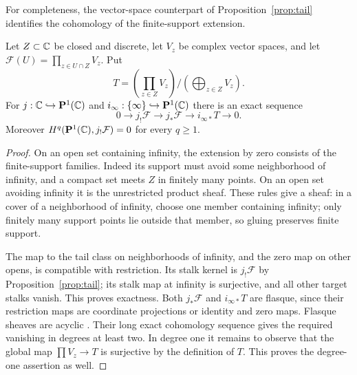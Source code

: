 For completeness, the vector-space counterpart of Proposition~\ref{prop:tail} identifies the cohomology of the finite-support extension.

\begin{proposition}\label{prop:packet-tail-exact}
Let $Z\subset\mathbb C$ be closed and discrete, let $V_z$ be complex vector spaces, and let $\mathcal F(U)=\prod_{z\in U\cap Z}V_z$. Put
\[
 T=\left(\prod_{z\in Z}V_z\right)
       \Big/\left(\bigoplus_{z\in Z}V_z\right).
\]
For $j:\mathbb C\hookrightarrow\mathbf P^1(\mathbb C)$ and $i_\infty:\{\infty\}\hookrightarrow\mathbf P^1(\mathbb C)$ there is an exact sequence
\[
 0\longrightarrow j_!\mathcal F\longrightarrow j_*\mathcal F
   \longrightarrow i_{\infty*}T\longrightarrow0.
\]
Moreover $H^q(\mathbf P^1(\mathbb C),j_!\mathcal F)=0$ for every $q\geq1$.
\end{proposition}
\begin{proof}
On an open set containing infinity, the extension by zero consists of the finite-support families. Indeed its support must avoid some neighborhood of infinity, and a compact set meets $Z$ in finitely many points. On an open set avoiding infinity it is the unrestricted product sheaf. These rules give a sheaf: in a cover of a neighborhood of infinity, choose one member containing infinity; only finitely many support points lie outside that member, so gluing preserves finite support.

The map to the tail class on neighborhoods of infinity, and the zero map on other opens, is compatible with restriction. Its stalk kernel is $j_!\mathcal F$ by Proposition~\ref{prop:tail}; its stalk map at infinity is surjective, and all other target stalks vanish. This proves exactness. Both $j_*\mathcal F$ and $i_{\infty*}T$ are flasque, since their restriction maps are coordinate projections or identity and zero maps. Flasque sheaves are acyclic \citep[Lemma 20.12.3, Tag 09SY]{StacksFlasque}. Their long exact cohomology sequence gives the required vanishing in degrees at least two. In degree one it remains to observe that the global map $\prod V_z\to T$ is surjective by the definition of $T$. This proves the degree-one assertion as well.
\end{proof}
